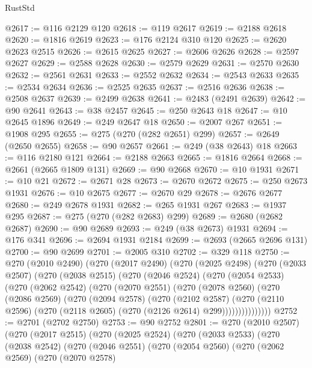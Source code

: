 \begin{lexlean}{RustStd}
\begin{coremodule}
@2617 := @116 @2129 @120
@2618 := @119 @2617
@2619 := @2188 @2618
@2620 := @1816 @2619
@2623 := @176 @2124 @310 @120
@2625 := @2620 @2623 @2515
@2626 := @2615 @2625
@2627 := @2606 @2626
@2628 := @2597 @2627
@2629 := @2588 @2628
@2630 := @2579 @2629
@2631 := @2570 @2630
@2632 := @2561 @2631
@2633 := @2552 @2632
@2634 := @2543 @2633
@2635 := @2534 @2634
@2636 := @2525 @2635
@2637 := @2516 @2636
@2638 := @2508 @2637
@2639 := @2499 @2638
@2641 := @2483 (@2491 @2639)
@2642 := @90 @2641
@2643 := @38 @2457
@2645 := @250 @2643 @18
@2647 := @10 @2645 @1896
@2649 := @249 @2647 @18
@2650 := @2007 @267
@2651 := @1908 @295
@2655 := @275 (@270 (@282 @2651) @299)
@2657 := @2649 (@2650 @2655)
@2658 := @90 @2657
@2661 := @249 (@38 @2643) @18
@2663 := @116 @2180 @121
@2664 := @2188 @2663
@2665 := @1816 @2664
@2668 := @2661 (@2665 @1809 @131)
@2669 := @90 @2668
@2670 := @10 @1931
@2671 := @10 @21
@2672 := @2671 @28
@2673 := @2670 @2672
@2675 := @250 @2673 @1931
@2676 := @10 @2675
@2677 := @2670 @29
@2678 := @2676 @2677
@2680 := @249 @2678 @1931
@2682 := @265 @1931 @267
@2683 := @1937 @295
@2687 := @275 (@270 (@282 @2683) @299)
@2689 := @2680 (@2682 @2687)
@2690 := @90 @2689
@2693 := @249 (@38 @2673) @1931
@2694 := @176 @341
@2696 := @2694 @1931 @2184
@2699 := @2693 (@2665 @2696 @131)
@2700 := @90 @2699
@2701 := @2005 @310
@2702 := @329 @118
@2750 := @270
    (@2010 @2490)
    (@270
      (@2017 @2490)
      (@270
        (@2025 @2498)
        (@270
          (@2033 @2507)
          (@270
            (@2038 @2515)
            (@270
              (@2046 @2524)
              (@270
                (@2054 @2533)
                (@270
                  (@2062 @2542)
                  (@270
                    (@2070 @2551)
                    (@270
                      (@2078 @2560)
                      (@270
                        (@2086 @2569)
                        (@270
                          (@2094 @2578)
                          (@270
                            (@2102 @2587)
                            (@270
                              (@2110 @2596)
                              (@270 (@2118 @2605) (@270 (@2126 @2614) @299)))))))))))))))
@2752 := @2701 (@2702 @2750)
@2753 := @90 @2752
@2801 := @270
    (@2010 @2507)
    (@270
      (@2017 @2515)
      (@270
        (@2025 @2524)
        (@270
          (@2033 @2533)
          (@270
            (@2038 @2542)
            (@270
              (@2046 @2551)
              (@270
                (@2054 @2560)
                (@270
                  (@2062 @2569)
                  (@270
                    (@2070 @2578)

\end{coremodule}
\end{lexlean}
